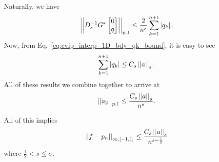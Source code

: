 %
Naturally, we have
%
\begin{equation}
    \left| \left| D_{s}^{-1}G^{*} \begin{bmatrix} 0 \\ q \end{bmatrix} \right| \right|_{p,1}
        \le \frac{2}{n^{s}}\sum_{k=1}^{n+1}\left| q_{k} \right|.
\end{equation}
%
Now, from Eq.~\eqref{eq:cvip_interp_1D_bdy_qk_bound}, it is easy to see
%
\begin{equation}
    \sum_{k=1}^{n+1} \left| q_{k} \right| \le C_{s}\left| \left| a \right| \right|_{s}.
\end{equation}
%
All of these results we combine together to arrive at
%
\begin{equation}
    \left| \left| \tilde{a}_{2} \right| \right|_{p,1} \le \frac{C_{s}\left| \left| a \right| \right|_{s}}{n^{s}}.
\end{equation}

All of this implies
%
\begin{equation}
    \left| \left| f - p_{n} \right| \right|_{\infty,[-1,1]}
        \le \frac{C_{s}\left| \left| a \right| \right|_{s}}{n^{s-\frac{1}{2}}}
\end{equation}
%
where $\frac{1}{2} < s \le \sigma$. 




